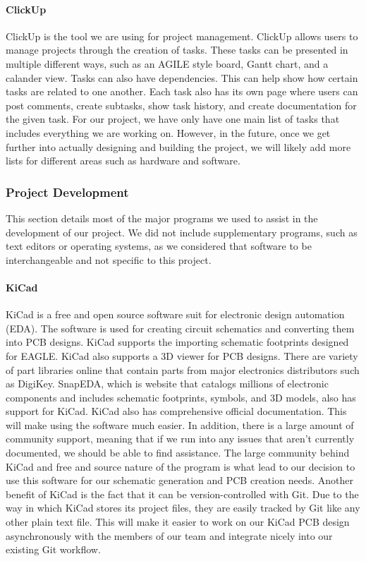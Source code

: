 \paragraph{ClickUp}
ClickUp is the tool we are using for project management. ClickUp allows users to manage projects through the creation of tasks. These tasks can be presented in multiple different ways, such as an AGILE style board, Gantt chart, and a calander view. Tasks can also have dependencies. This can help show how certain tasks are related to one another. Each task also has its own page where users can post comments, create subtasks, show task history, and create documentation for the given task. For our project, we have only have one main list of tasks that includes everything we are working on. However, in the future, once we get further into actually designing and building the project, we will likely add more lists for different areas such as hardware and software.

\subsubsection{Project Development}
This section details most of the major programs we used to assist in the development of our project. We did not include supplementary programs, such as text editors or operating systems, as we considered that software to be interchangeable and not specific to this project.

\paragraph{KiCad}
KiCad is a free and open source software suit for electronic design automation (EDA). The software is used for creating circuit schematics and converting them into PCB designs. KiCad supports the importing schematic footprints designed for EAGLE. KiCad also supports a 3D viewer for PCB designs. There are variety of part libraries online that contain parts from major electronics distributors such as DigiKey. SnapEDA, which is website that catalogs millions of electronic components and includes schematic footprints, symbols, and 3D models, also has support for KiCad. KiCad also has comprehensive official documentation. This will make using the software much easier. In addition, there is a large amount of community support, meaning that if we run into any issues that aren't currently documented, we should be able to find assistance. The large community behind KiCad and free and source nature of the program is what lead to our decision to use this software for our schematic generation and PCB creation needs. Another benefit of KiCad is the fact that it can be version-controlled with Git. Due to the way in which KiCad stores its project files, they are easily tracked by Git like any other plain text file. This will make it easier to work on our KiCad PCB design asynchronously with the members of our team and integrate nicely into our existing Git workflow.

